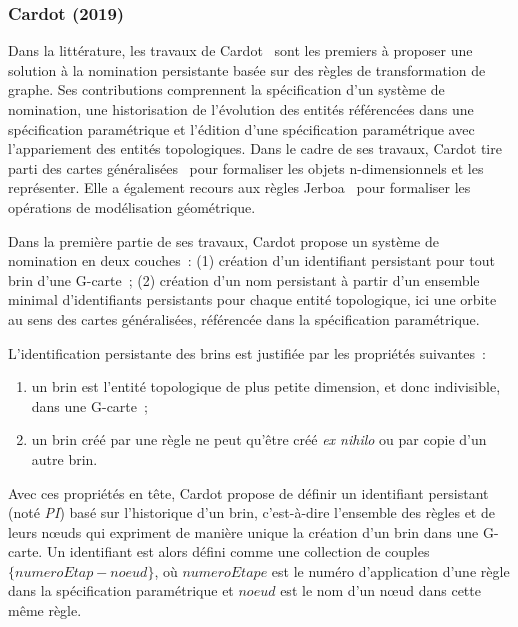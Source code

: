 

\subsubsection*{Cardot (2019) }
\label{sec:etat-art-reevaluation-synthese-cardot}


Dans la littérature, les travaux de Cardot~\cite{cardot2019} sont les premiers à
proposer une solution à la nomination persistante basée sur des règles de
transformation de graphe. %
Ses contributions comprennent la spécification d'un système de nomination, une
historisation de l'évolution des entités référencées dans une spécification
paramétrique et l'édition d'une spécification paramétrique avec l'appariement
des entités topologiques. %
Dans le cadre de ses travaux, Cardot tire parti  des cartes
généralisées~\cite{lienhardt1994n,Damiand-Lienhardt14} pour formaliser les
objets n-dimensionnels et les représenter. %
Elle a également recours aux règles Jerboa~\cite{belhaouari2014jerboa} pour
formaliser les opérations de modélisation géométrique. %

Dans la première partie de ses travaux, Cardot propose un système de nomination
en deux couches~: (1) création d'un identifiant persistant pour tout brin d'une
G-carte~; (2) création d'un nom persistant à partir d'un ensemble
minimal d'identifiants persistants pour chaque entité topologique, ici
une orbite au sens des cartes généralisées, référencée dans la spécification
paramétrique. %

L'identification persistante des brins est justifiée par les propriétés
suivantes~:
\begin{enumerate}
	\item un brin est l'entité topologique de plus petite dimension, et donc
	      indivisible, dans une G-carte~;
	\item un brin créé par une règle ne peut qu'être créé \textit{ex nihilo} ou
	      par copie d'un autre brin. %
\end{enumerate}
Avec ces propriétés en tête, Cardot propose de définir un identifiant persistant
(noté \emph{PI}) basé sur l'historique d'un brin, c'est-à-dire l'ensemble des
règles et de leurs n\oe uds qui expriment de manière unique la création d'un
brin dans une G-carte. %
Un identifiant est alors défini comme une collection de couples
\(\{numeroEtap - noeud\}\), où \(numeroEtape\) est le numéro d'application d'une
règle dans la spécification paramétrique et \(noeud\) est le nom d'un n\oe ud
dans cette même règle.%

